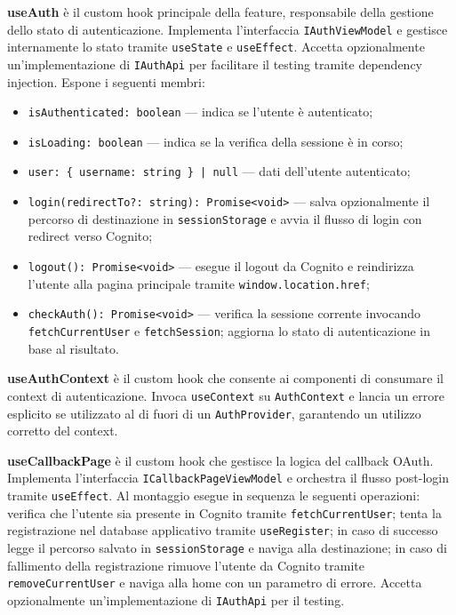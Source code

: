 \documentclass[a4paper, 11pt]{article}
\begin{document}
\textbf{useAuth} è il custom hook principale della feature, responsabile della gestione dello
stato di autenticazione. Implementa l'interfaccia \texttt{IAuthViewModel} e gestisce
internamente lo stato tramite \texttt{useState} e \texttt{useEffect}. Accetta opzionalmente
un'implementazione di \texttt{IAuthApi} per facilitare il testing tramite dependency injection.
Espone i seguenti membri:
\begin{itemize}
  \item \texttt{isAuthenticated: boolean} — indica se l'utente è autenticato;
  \item \texttt{isLoading: boolean} — indica se la verifica della sessione è in corso;
  \item \texttt{user: \{ username: string \} | null} — dati dell'utente autenticato;
  \item \texttt{login(redirectTo?: string): Promise<void>} — salva opzionalmente il percorso
        di destinazione in \texttt{sessionStorage} e avvia il flusso di login con redirect
        verso Cognito;
  \item \texttt{logout(): Promise<void>} — esegue il logout da Cognito e reindirizza
        l'utente alla pagina principale tramite \texttt{window.location.href};
  \item \texttt{checkAuth(): Promise<void>} — verifica la sessione corrente invocando
        \texttt{fetchCurrentUser} e \texttt{fetchSession}; aggiorna lo stato di autenticazione
        in base al risultato.
\end{itemize}

\textbf{useAuthContext} è il custom hook che consente ai componenti di consumare il context
di autenticazione. Invoca \texttt{useContext} su \texttt{AuthContext} e lancia un errore
esplicito se utilizzato al di fuori di un \texttt{AuthProvider}, garantendo un utilizzo
corretto del context.

\textbf{useCallbackPage} è il custom hook che gestisce la logica del callback OAuth.
Implementa l'interfaccia \texttt{ICallbackPageViewModel} e orchestra il flusso post-login
tramite \texttt{useEffect}. Al montaggio esegue in sequenza le seguenti operazioni: verifica
che l'utente sia presente in Cognito tramite \texttt{fetchCurrentUser}; tenta la registrazione
nel database applicativo tramite \texttt{useRegister}; in caso di successo legge il percorso
salvato in \texttt{sessionStorage} e naviga alla destinazione; in caso di fallimento della
registrazione rimuove l'utente da Cognito tramite \texttt{removeCurrentUser} e naviga alla
home con un parametro di errore. Accetta opzionalmente un'implementazione di \texttt{IAuthApi}
per il testing.
\end{document}
